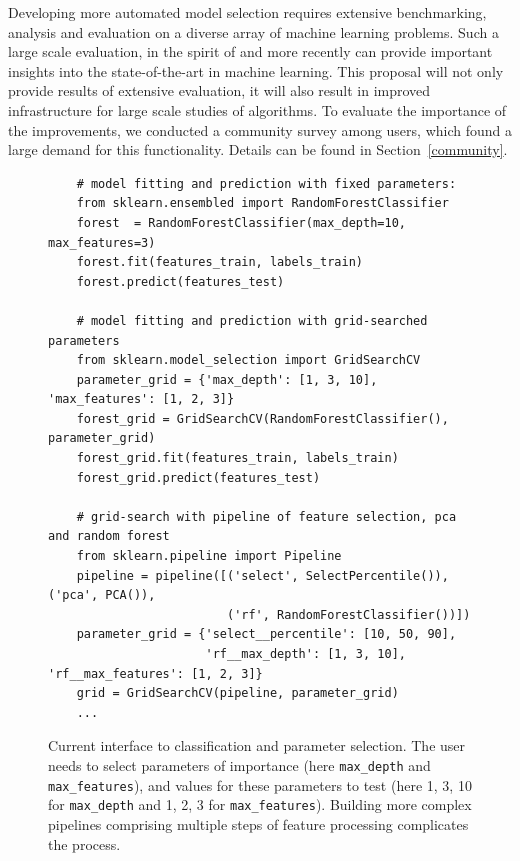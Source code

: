 Developing more automated model selection requires extensive benchmarking,
analysis and evaluation on a diverse array of machine learning problems. Such a
large scale evaluation, in the spirit of \textcite{caruana2008empirical,
caruana2006empirical} and more recently \textcite{feurer-nips2015} can provide
important insights into the state-of-the-art in machine learning. This proposal
will not only provide results of extensive evaluation, it will also result in
improved infrastructure for large scale studies of algorithms.
To evaluate the importance of the improvements, we conducted a community survey
among \sklearn{} users, which found a large demand for this functionality.
Details can be found in Section~\ref{community}.

\begin{figure}
    \begin{verbatim}
    # model fitting and prediction with fixed parameters:
    from sklearn.ensembled import RandomForestClassifier
    forest  = RandomForestClassifier(max_depth=10, max_features=3)
    forest.fit(features_train, labels_train)
    forest.predict(features_test)

    # model fitting and prediction with grid-searched parameters
    from sklearn.model_selection import GridSearchCV
    parameter_grid = {'max_depth': [1, 3, 10], 'max_features': [1, 2, 3]}
    forest_grid = GridSearchCV(RandomForestClassifier(), parameter_grid)
    forest_grid.fit(features_train, labels_train)
    forest_grid.predict(features_test)

    # grid-search with pipeline of feature selection, pca and random forest
    from sklearn.pipeline import Pipeline
    pipeline = pipeline([('select', SelectPercentile()), ('pca', PCA()),
                         ('rf', RandomForestClassifier())])
    parameter_grid = {'select__percentile': [10, 50, 90],
                      'rf__max_depth': [1, 3, 10], 'rf__max_features': [1, 2, 3]}
    grid = GridSearchCV(pipeline, parameter_grid)
    ... 
    \end{verbatim}
    \vspace{-5mm}
    \label{gridsearch}
    \caption{Current interface to \sklearn{} classification and parameter
        selection. The user needs to select parameters of importance (here
        \texttt{max\_depth} and \texttt{max\_features}), and values for these
        parameters to test (here 1, 3, 10 for \texttt{max\_depth} and 1, 2, 3
        for \texttt{max\_features}). Building more complex pipelines comprising
        multiple steps of feature processing complicates the process.}
\end{figure}

